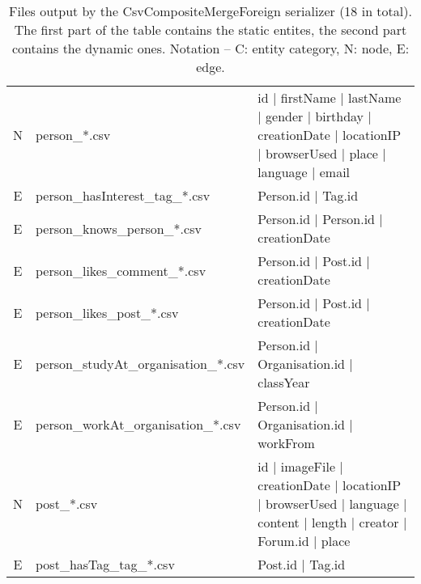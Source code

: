 \begin{table}[htb]
{\begin{tabular}{|c|l|l|}
            \hline
            N                    & person\_*.csv                        & id | firstName | lastName | gender | birthday | creationDate | locationIP | browserUsed | place | language | email  \\
            E                    & person\_hasInterest\_tag\_*.csv      & Person.id | Tag.id                                                                                                  \\
            E                    & person\_knows\_person\_*.csv         & Person.id | Person.id | creationDate                                                                                \\
            E                    & person\_likes\_comment\_*.csv        & Person.id | Post.id | creationDate                                                                                  \\
            E                    & person\_likes\_post\_*.csv           & Person.id | Post.id | creationDate                                                                                  \\
            E                    & person\_studyAt\_organisation\_*.csv & Person.id | Organisation.id | classYear                                                                             \\
            E                    & person\_workAt\_organisation\_*.csv  & Person.id | Organisation.id | workFrom                                                                              \\
            \hline
            N                    & post\_*.csv                          & id | imageFile | creationDate | locationIP | browserUsed | language | content | length | creator | Forum.id | place \\
            E                    & post\_hasTag\_tag\_*.csv             & Post.id | Tag.id                                                                                                    \\
            \hline
        \end{tabular}}
    \caption{Files output by the CsvCompositeMergeForeign serializer (18 in total). The first part of the table contains the static entites, the second part contains the dynamic ones. Notation -- C: entity category, N: node, E: edge.}
    \label{table:csv_composite_merge_foreign}
\end{table}
